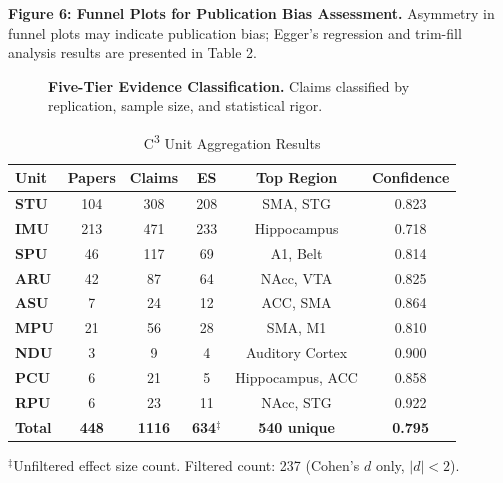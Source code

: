 \documentclass[9pt,onecolumn]{article}
\newcommand{\STU}{\textcolor{stucolor}{\textbf{STU}}}
\newcommand{\IMU}{\textcolor{imucolor}{\textbf{IMU}}}
\newcommand{\SPU}{\textcolor{spucolor}{\textbf{SPU}}}
\newcommand{\ARU}{\textcolor{arucolor}{\textbf{ARU}}}
\newcommand{\ASU}{\textcolor{asucolor}{\textbf{ASU}}}
\newcommand{\MPU}{\textcolor{mpucolor}{\textbf{MPU}}}
\newcommand{\NDU}{\textcolor{nducolor}{\textbf{NDU}}}
\newcommand{\PCU}{\textcolor{pcucolor}{\textbf{PCU}}}
\newcommand{\RPU}{\textcolor{rpucolor}{\textbf{RPU}}}
\begin{document}
\vspace{0.5em}
\noindent

\vspace{0.3em}
\noindent
{\fontsize{7}{8.4}\selectfont\textbf{Figure 6: Funnel Plots for Publication Bias Assessment.} Asymmetry in funnel plots may indicate publication bias; Egger's regression and trim-fill analysis results are presented in Table 2.}
\label{fig:funnel-plots}

\vspace{1em}

\begin{figure}[H]
\centering
\vspace{0.3em}
{\fontsize{7}{8.4}\selectfont\textbf{Five-Tier Evidence Classification.} Claims classified by replication, sample size, and statistical rigor.}
\label{tab:pyramid}
\end{figure}

\vspace{0.5em}

\begin{table}[H]
\centering
\caption{C\textsuperscript{3} Unit Aggregation Results}
\label{tab:aggregation}
\small
\begin{tabular}{@{}lccccc@{}}
\toprule
\textbf{Unit} & \textbf{Papers} & \textbf{Claims} & \textbf{ES} & \textbf{Top Region} & \textbf{Confidence} \\
\midrule
\STU{} & 104 & 308 & 208 & SMA, STG & 0.823 \\
\IMU{} & 213 & 471 & 233 & Hippocampus & 0.718 \\
\SPU{} & 46 & 117 & 69 & A1, Belt & 0.814 \\
\ARU{} & 42 & 87 & 64 & NAcc, VTA & 0.825 \\
\ASU{} & 7 & 24 & 12 & ACC, SMA & 0.864 \\
\MPU{} & 21 & 56 & 28 & SMA, M1 & 0.810 \\
\NDU{} & 3 & 9 & 4 & Auditory Cortex & 0.900 \\
\PCU{} & 6 & 21 & 5 & Hippocampus, ACC & 0.858 \\
\RPU{} & 6 & 23 & 11 & NAcc, STG & 0.922 \\
\midrule
\textbf{Total} & \textbf{448} & \textbf{1116} & \textbf{634$^\ddagger$} & \textbf{540 unique} & \textbf{0.795} \\
\bottomrule
\end{tabular}

\vspace{0.3em}
{\raggedright\footnotesize
$^\ddagger$Unfiltered effect size count. Filtered count: 237 (Cohen's $d$ only, $|d| < 2$).\par}
\end{table}
\end{document}
